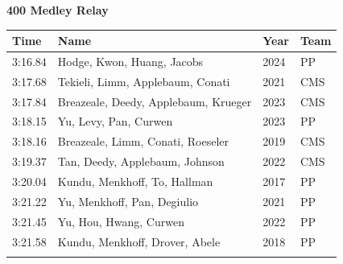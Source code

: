 \noindent\begin{minipage}[t]{0.98\textwidth}
\centering
\textbf{\textcolor{teamprimary}{400 Medley Relay}}\par
\vspace{0.5em}
\centering
\small
\renewcommand{\arraystretch}{1.0}
\setlength{\tabcolsep}{4pt}
\begin{tabular}{@{}p{2.7cm}p{4.3cm}p{1.6cm}p{2.7cm}@{}}
\toprule
\textbf{Time} & \textbf{Name} & \textbf{Year} & \textbf{Team} \\
\midrule
3:16.84 & Hodge, Kwon, Huang, Jacobs & 2024 & PP \\
3:17.68 & Tekieli, Limm, Applebaum, Conati & 2021 & CMS \\
3:17.84 & Breazeale, Deedy, Applebaum, Krueger & 2023 & CMS \\
3:18.15 & Yu, Levy, Pan, Curwen & 2023 & PP \\
3:18.16 & Breazeale, Limm, Conati, Roeseler & 2019 & CMS \\
3:19.37 & Tan, Deedy, Applebaum, Johnson & 2022 & CMS \\
3:20.04 & Kundu, Menkhoff, To, Hallman & 2017 & PP \\
3:21.22 & Yu, Menkhoff, Pan, Degiulio & 2021 & PP \\
3:21.45 & Yu, Hou, Hwang, Curwen & 2022 & PP \\
3:21.58 & Kundu, Menkhoff, Drover, Abele & 2018 & PP \\
\bottomrule
\vspace{0.5em}
\end{tabular}
\end{minipage}